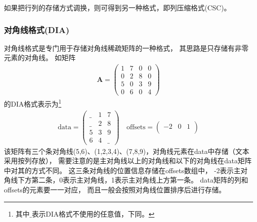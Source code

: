 如果把行列的存储方式调换，则可得到另一种格式，即列压缩格式(CSC)。

\subsubsection{对角线格式(DIA)}
\label{sec:gpu.sparseformat.dia}

对角线格式是专门用于存储对角线稀疏矩阵的一种格式，
其思路是只存储有非零元素的对角线。
如矩阵\cite{bell2008spmv}
\begin{align}
\bm{A}=\begin{pmatrix}
1 & 7 & 0 & 0\\
0 & 2 & 8 & 0\\
5 & 0 & 3 & 9\\
0 & 6 & 0 & 4
\end{pmatrix}
\label{equ:gpu.sparseformat.example.matrix4}
\end{align}
的DIA格式表示为\footnote{其中$\_$表示DIA格式不使用的任意值，下同。}
\begin{align*}
\mathrm{data}=\begin{pmatrix}
\_ & 1 & 7\\
\_ & 2 & 8\\
5 & 3 & 9\\
6 & 4 & \_
\end{pmatrix}
\quad
\mathrm{offsets}=\begin{pmatrix}
-2 & 0 & 1\\
\end{pmatrix}
\end{align*}
该矩阵有三个条对角线(5,6)、(1,2,3,4)、(7,8,9)，对角线元素在data中存储（文本采用按列存放），
需要注意的是主对角线以上的对角线和以下的对角线在data矩阵中对其的方式不同。
这三条对角线的位置信息存储在offsets数组中，
-2表示主对角线下方第二条，0表示主对角线，1表示主对角线上方第一条。
data矩阵的列和offsets的元素要一一对应，
而且一般会按照对角线位置排序后进行存储。


